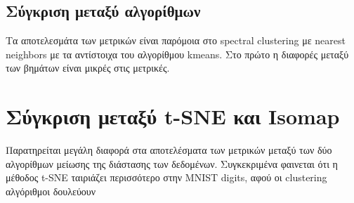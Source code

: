 \subsection{Σύγκριση μεταξύ αλγορίθμων}
Τα αποτελεσμάτα των μετρικών είναι παρόμοια στο spectral clustering με nearest neighbors με τα αντίστοιχα του αλγορίθμου kmeans. Στο πρώτο η διαφορές μεταξύ των βημάτων είναι μικρές στις μετρικές.

\clearpage

\section{Σύγκριση μεταξύ t-SNE και Isomap}
Παρατηρείται μεγάλη διαφορά στα αποτελέσματα των μετρικών μεταξύ των δύο αλγορίθμων μείωσης της διάστασης των δεδομένων. Συγκεκριμένα φαινεται ότι η μέθοδος t-SNE ταιριάζει περισσότερο στην MNIST digits, αφού οι clustering αλγόριθμοι δουλεύουν 